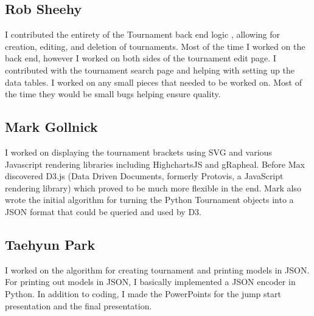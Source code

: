 \documentclass{article}
\begin{document}
\subsection{Rob Sheehy}
I contributed the entirety of the Tournament back end logic , allowing for creation, editing, and deletion of tournaments. Most of the time I worked on the back end, however I worked on both sides of the tournament edit page. I contributed with the tournament search page and helping with setting up the data tables. I worked on any small pieces that needed to be worked on. Most of the time they would be small bugs helping ensure quality.

\subsection{Mark Gollnick}
I worked on displaying the tournament brackets using SVG and various Javascript rendering libraries including HighchartsJS and gRapheal. Before Max discovered D3.js (Data Driven Documents, formerly Protovis, a JavaScript rendering library) which proved to be much more flexible in the end. Mark also wrote the initial algorithm for turning the Python Tournament objects into a JSON format that could be queried and used by D3.

\subsection{Taehyun Park}
I worked on the algorithm for creating tournament and printing models in JSON. For printing out models in JSON, I basically implemented a JSON encoder in Python. In addition to coding, I made the PowerPoints for the jump start presentation and the final presentation.
\end{document}
